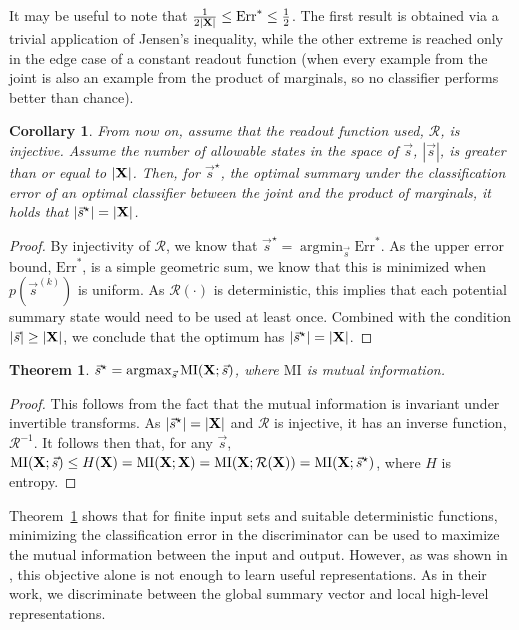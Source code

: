 \documentclass{article} \usepackage{iclr2019_conference,times}
\newtheorem{theo}{Theorem}
\newtheorem{cor}{Corollary}
\DeclareMathOperator*{\argmax}{argmax}
\DeclareMathOperator*{\argmin}{argmin}
\begin{document}
It may be useful to note that $\frac{1}{2|{\bf X}|} \leq \mathrm{Err}^* \leq \frac{1}{2}$. The first result is obtained via a trivial application of Jensen's inequality, while the other extreme is reached only in the edge case of a constant readout function (when every example from the joint is also an example from the product of marginals, so no classifier performs better than chance).
\begin{cor}
From now on, assume that the readout function used, $\mathcal{R}$, is injective. Assume the number of allowable states in the space of $\vec{s}$, $|\vec{s}|$, is greater than or equal to $|{\bf X}|$. Then, for $\vec{s}^{\star}$, the optimal summary under the classification error of an optimal classifier between the joint and the product of marginals, it holds that $|\vec{s}^{\star}| = |{\bf X}|$.
\end{cor}
\begin{proof}
By injectivity of $\mathcal{R}$, we know that $\vec{s}^{\star} = \argmin_{\vec{s}} \mathrm{Err}^*$.
As the upper error bound, $\mathrm{Err}^*$, is a simple geometric sum, we know that this is minimized when $p(\vec{s}^{(k)})$ is uniform.
As $\mathcal{R}(\cdot)$ is deterministic, this implies that each potential summary state would need to be used at least once. Combined with the condition $|\vec{s}| \geq |{\bf X}|$, we conclude that the optimum has $|\vec{s}^{\star}| = |{\bf X}|$.
\end{proof}

\begin{theo}
$\vec{s}^{\star} = \argmax_{\vec{s}} \mathrm{MI}({\bf X}; \vec{s})$, where $\mathrm{MI}$ is mutual information.
\label{theorem}
\end{theo}
\begin{proof}
This follows from the fact that the mutual information is invariant under invertible transforms.
As $|\vec{s}^{\star}| = |{\bf X}|$ and $\mathcal{R}$ is injective, it has an inverse function, $\mathcal{R}^{-1}$.
It follows then that, for any $\vec{s}$, $\mathrm{MI}({\bf X}; \vec{s}) \leq  H({\bf X}) =\mathrm{MI}({\bf X}; {\bf X}) = \mathrm{MI}({\bf X}; \mathcal{R}({\bf X})) = \mathrm{MI}({\bf X}; \vec{s}^{\star})$, where $H$ is entropy.
\end{proof}

Theorem~\ref{theorem} shows that for finite input sets and suitable deterministic functions, minimizing the classification error in the discriminator can be used to maximize the mutual information between the input and output.
However, as was shown in \citet{hjelm2018learning}, this objective alone is not enough to learn useful representations.
As in their work, we discriminate between the global summary vector and local high-level representations.
\end{document}
